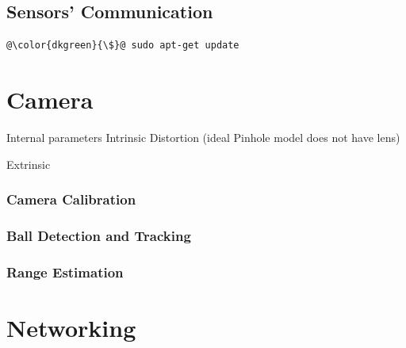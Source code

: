\subsection{Sensors' Communication} 

\begin{lstlisting}[language=sh, escapechar=@, caption={Descriptive Caption Text},label=DescriptiveLabel]
    @\color{dkgreen}{\$}@ sudo apt-get update
\end{lstlisting}


\section{Camera}
Internal parameters
    Intrinsic 
    Distortion (ideal Pinhole model does not have lens)

    
Extrinsic 
\subsubsection{Camera Calibration}
\subsubsection{Ball Detection and Tracking}
\subsubsection{Range Estimation}


\section{Networking}


